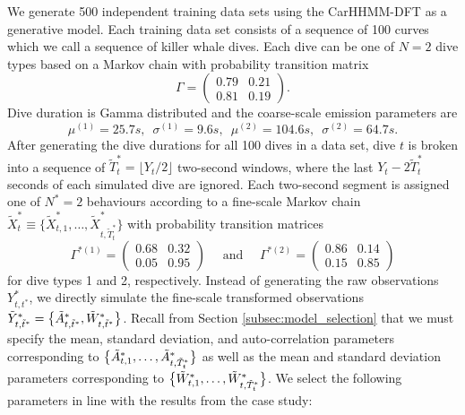 We generate 500 independent training data sets using the CarHHMM-DFT as a generative model. Each training data set consists of a sequence of 100 curves which we call a sequence of killer whale dives. Each dive can be one of $N=2$ dive types based on a Markov chain with probability transition matrix
%
$$\Gamma = \begin{pmatrix} 0.79 & 0.21 \\ 0.81 & 0.19 \end{pmatrix}.$$
%
Dive duration is Gamma distributed and the coarse-scale emission parameters are 
%
\[\mu^{(1)} = 25.7s, \enspace \sigma^{(1)} = 9.6s, \enspace \mu^{(2)} = 104.6s, \enspace \sigma^{(2)} = 64.7s.\]
%
After generating the dive durations for all 100 dives in a data set, dive $t$ is broken into a sequence of $\tilde T^*_t = \lfloor Y_t/2 \rfloor$ two-second windows, where the last $Y_t - 2 \tilde T^*_t$ seconds of each simulated dive are ignored. Each two-second segment is assigned one of $N^*=2$ behaviours according to a fine-scale Markov chain $\tilde X^*_t \equiv \big\{\tilde X^*_{t,1}, \ldots, \tilde X^*_{t,\tilde T^*_t} \big\}$ with probability transition matrices
%
\[\Gamma^{*(1)} = \begin{pmatrix} 0.68 & 0.32 \\ 0.05 & 0.95 \end{pmatrix} \quad \text{ and } \quad \Gamma^{*(2)} = \begin{pmatrix} 0.86 & 0.14 \\ 0.15 & 0.85 \end{pmatrix}\]
%
for dive types 1 and 2, respectively.
Instead of generating the raw observations $Y^*_{t,t^*}$, we directly simulate the fine-scale transformed observations $\tilde{Y}^*_{t,\tilde t^*} = \big\{\tilde{A}^*_{t,\tilde t^*}, \tilde{W}^*_{t,\tilde t^*}\big\}$. Recall from Section \ref{subsec:model_selection} that we must specify the mean, standard deviation, and auto-correlation parameters corresponding to $\big\{\tilde{A}^*_{t,1},\ldots,\tilde{A}^*_{t,\tilde T_t^*}\big\}$ as well as the mean and standard deviation parameters corresponding to $\big\{\tilde{W}^*_{t,1},\ldots,\tilde{W}^*_{t,\tilde T_t^*}\big\}$. We select the following parameters in line with the results from the case study:
